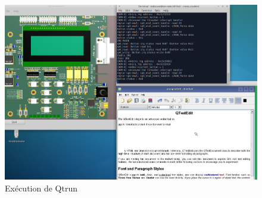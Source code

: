 \begin{figure}[H]
	\begin{center}
		\includegraphics[width=16cm]{img/dom0.png}
		\caption{Exécution de Qtrun}
		\label{qtrun}
	\end{center}
\end{figure}
